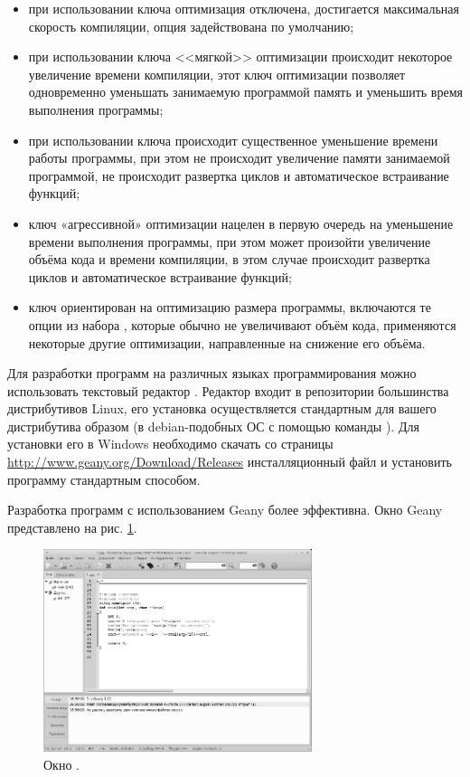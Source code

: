 \begin{itemize}
\item при использовании ключа  оптимизация отключена, достигается максимальная скорость компиляции, опция
задействована по умолчанию;
\item при использовании ключа <<мягкой>> оптимизации  происходит некоторое увеличение времени
компиляции, этот ключ оптимизации позволяет одновременно уменьшать занимаемую программой память и уменьшить время
выполнения программы;
\item при использовании ключа  происходит существенное уменьшение времени работы программы, при этом не
происходит увеличение памяти занимаемой программой, не происходит развертка циклов и автоматическое встраивание
функций;
\item ключ «агрессивной» оптимизации  нацелен в первую очередь на уменьшение времени выполнения программы,
при этом может произойти увеличение объёма кода и времени компиляции, в этом случае происходит развертка циклов и
автоматическое встраивание функций;
\item ключ  ориентирован на оптимизацию размера программы, включаются те опции из набора ,
которые обычно не увеличивают объём кода, применяются некоторые другие оптимизации, направленные на снижение его
объёма.
\end{itemize}

Для разработки программ на различных языках программирования можно использовать текстовый редактор . 
Редактор  входит в репозитории большинства дистрибутивов Linux, его установка осуществляется 
стандартным для вашего дистрибутива
образом (в debian-подобных ОС с помощью команды ). Для установки его в Windows необходимо
скачать со страницы \url{http://www.geany.org/Download/Releases} инсталляционный файл и установить программу стандартным
способом.

Разработка программ с использованием Geany более эффективна. Окно Geany представлено на рис. \ref{app:refDrawing5}. 

\begin{figure}[htb]
\begin{center}
\includegraphics[width=0.7\textwidth]{img/ris_app_6}
\caption[Окно .]{Окно .}
\label{app:refDrawing5}
\end{center}
\end{figure}


